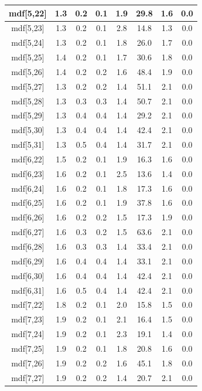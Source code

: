 \begin{longtable}{|c|c|c|c|c|c|c|c|}
\hline
mdf[5,22] & 1.3 & 0.2 & 0.1 & 1.9 & 29.8 & 1.6 & 0.0 \\
\hline
mdf[5,23] & 1.3 & 0.2 & 0.1 & 2.8 & 14.8 & 1.3 & 0.0 \\
\hline
mdf[5,24] & 1.3 & 0.2 & 0.1 & 1.8 & 26.0 & 1.7 & 0.0 \\
\hline
mdf[5,25] & 1.4 & 0.2 & 0.1 & 1.7 & 30.6 & 1.8 & 0.0 \\
\hline
mdf[5,26] & 1.4 & 0.2 & 0.2 & 1.6 & 48.4 & 1.9 & 0.0 \\
\hline
mdf[5,27] & 1.3 & 0.2 & 0.2 & 1.4 & 51.1 & 2.1 & 0.0 \\
\hline
mdf[5,28] & 1.3 & 0.3 & 0.3 & 1.4 & 50.7 & 2.1 & 0.0 \\
\hline
mdf[5,29] & 1.3 & 0.4 & 0.4 & 1.4 & 29.2 & 2.1 & 0.0 \\
\hline
mdf[5,30] & 1.3 & 0.4 & 0.4 & 1.4 & 42.4 & 2.1 & 0.0 \\
\hline
mdf[5,31] & 1.3 & 0.5 & 0.4 & 1.4 & 31.7 & 2.1 & 0.0 \\
\hline
mdf[6,22] & 1.5 & 0.2 & 0.1 & 1.9 & 16.3 & 1.6 & 0.0 \\
\hline
mdf[6,23] & 1.6 & 0.2 & 0.1 & 2.5 & 13.6 & 1.4 & 0.0 \\
\hline
mdf[6,24] & 1.6 & 0.2 & 0.1 & 1.8 & 17.3 & 1.6 & 0.0 \\
\hline
mdf[6,25] & 1.6 & 0.2 & 0.1 & 1.9 & 37.8 & 1.6 & 0.0 \\
\hline
mdf[6,26] & 1.6 & 0.2 & 0.2 & 1.5 & 17.3 & 1.9 & 0.0 \\
\hline
mdf[6,27] & 1.6 & 0.3 & 0.2 & 1.5 & 63.6 & 2.1 & 0.0 \\
\hline
mdf[6,28] & 1.6 & 0.3 & 0.3 & 1.4 & 33.4 & 2.1 & 0.0 \\
\hline
mdf[6,29] & 1.6 & 0.4 & 0.4 & 1.4 & 33.1 & 2.1 & 0.0 \\
\hline
mdf[6,30] & 1.6 & 0.4 & 0.4 & 1.4 & 42.4 & 2.1 & 0.0 \\
\hline
mdf[6,31] & 1.6 & 0.5 & 0.4 & 1.4 & 42.4 & 2.1 & 0.0 \\
\hline
mdf[7,22] & 1.8 & 0.2 & 0.1 & 2.0 & 15.8 & 1.5 & 0.0 \\
\hline
mdf[7,23] & 1.9 & 0.2 & 0.1 & 2.1 & 16.4 & 1.5 & 0.0 \\
\hline
mdf[7,24] & 1.9 & 0.2 & 0.1 & 2.3 & 19.1 & 1.4 & 0.0 \\
\hline
mdf[7,25] & 1.9 & 0.2 & 0.1 & 1.8 & 20.8 & 1.6 & 0.0 \\
\hline
mdf[7,26] & 1.9 & 0.2 & 0.2 & 1.6 & 45.1 & 1.8 & 0.0 \\
\hline
mdf[7,27] & 1.9 & 0.2 & 0.2 & 1.4 & 20.7 & 2.1 & 0.0 \\

\end{longtable}

